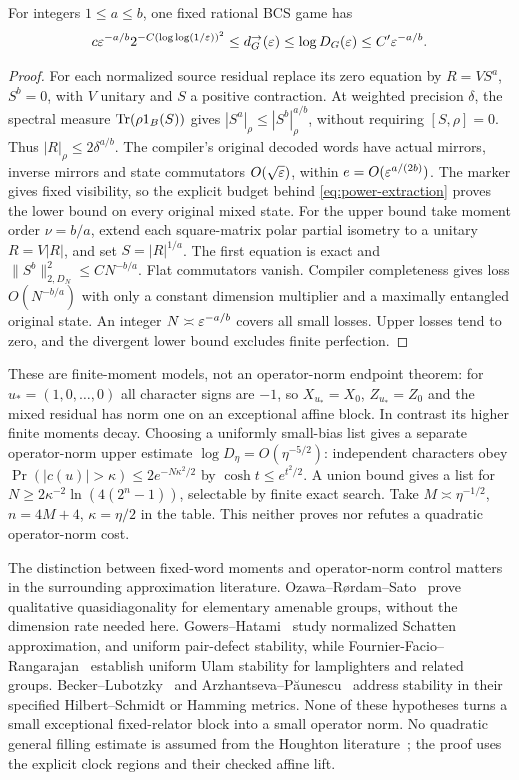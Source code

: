 \begin{corollary}\label{cor:power-rational}
For integers $1\le a\le b$, one fixed rational BCS game has
\[
 c\varepsilon^{-a/b}2^{-C(\log\log(1/\varepsilon))^2}\le d_G^\to(\varepsilon)
 \le\log D_G(\varepsilon)\le C'\varepsilon^{-a/b}.
\]
\end{corollary}
\begin{proof}
For each normalized source residual replace its zero equation by $R=VS^a$, $S^b=0$, with $V$ unitary and $S$ a positive contraction. At weighted precision $\delta$, the spectral measure $\operatorname{Tr}(\rho1_B(S))$ gives $|S^a|_\rho\le|S^b|_\rho^{a/b}$, without requiring $[S,\rho]=0$. Thus $|R|_\rho\le2\delta^{a/b}$. The compiler's original decoded words have actual mirrors, inverse mirrors and state commutators $O(\sqrt{\varepsilon})$, within $e=O(\varepsilon^{a/(2b)})$. The marker gives fixed visibility, so the explicit budget behind \eqref{eq:power-extraction} proves the lower bound on every original mixed state.
For the upper bound take moment order $\nu=b/a$, extend each square-matrix polar partial isometry to a unitary $R=V|R|$, and set $S=|R|^{1/a}$. The first equation is exact and $\|S^b\|_{2,D_N}^2\le C N^{-b/a}$. Flat commutators vanish. Compiler completeness gives loss $O(N^{-b/a})$ with only a constant dimension multiplier and a maximally entangled original state. An integer $N\asymp\varepsilon^{-a/b}$ covers all small losses. Upper losses tend to zero, and the divergent lower bound excludes finite perfection.
\end{proof}

These are finite-moment models, not an operator-norm endpoint theorem: for $u_*=(1,0,\ldots,0)$ all character signs are $-1$, so $X_{u_*}=X_0$, $Z_{u_*}=Z_0$ and the mixed residual has norm one on an exceptional affine block. In contrast its higher finite moments decay. Choosing a uniformly small-bias list gives a separate operator-norm upper estimate $\log D_\eta=O(\eta^{-5/2})$: independent characters obey $\Pr(|c(u)|>\kappa)\le2e^{-N\kappa^2/2}$ by $\cosh t\le e^{t^2/2}$. A union bound gives a list for $N\ge2\kappa^{-2}\ln(4(2^n-1))$, selectable by finite exact search. Take $M\asymp\eta^{-1/2}$, $n=4M+4$, $\kappa=\eta/2$ in the table. This neither proves nor refutes a quadratic operator-norm cost.


The distinction between fixed-word moments and operator-norm control matters in the surrounding approximation literature. Ozawa--R\o rdam--Sato~\cite{ORS14} prove qualitative quasidiagonality for elementary amenable groups, without the dimension rate needed here. Gowers--Hatami~\cite{GH17} study normalized Schatten approximation, and uniform pair-defect stability, while Fournier-Facio--Rangarajan~\cite{FFR23} establish uniform Ulam stability for lamplighters and related groups. Becker--Lubotzky~\cite{BL18} and Arzhantseva--P\u aunescu~\cite{AP14} address stability in their specified Hilbert--Schmidt or Hamming metrics. None of these hypotheses turns a small exceptional fixed-relator block into a small operator norm. No quadratic general filling estimate is assumed from the Houghton literature~\cite{Lee12}; the proof uses the explicit clock regions and their checked affine lift.
